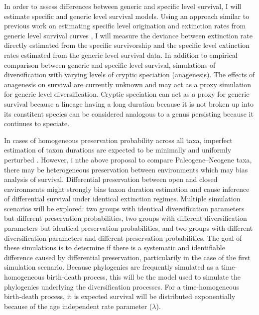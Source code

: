 \documentclass[12pt,letterpaper]{article}
\begin{document}
In order to assess differences between generic and specific level survival, I will estimate specific and generic level survival models. Using an approach similar to previous work on estimating specific level origination and extinction rates from generic level survival curves \citep{Foote1988}, I will measure the deviance between extinction rate directly estimated from the specific survivorship and the specific level extinction rates estimated from the generic level survival data. In addition to empirical comparison between generic and specific level survival, simulations of diversification with varying levels of cryptic speciation (anagenesis). The effects of anagenesis on survival are currently unknown and may act as a proxy simulation for generic level diversification. Cryptic speciation can act as a proxy for generic survival because a lineage having a long duration because it is not broken up into its constitent species can be considered analogous to a genus persisting because it continues to speciate. %

In cases of homogeneous preservation probability across all taxa, imperfect estimation of taxon durations are expected to be minimally and uniformly perturbed \citep{Sepkoski1975}. However, i nthe above proposal to compare Paleogene--Neogene taxa, there may be heterogeneous preservation between environments which may bias analysis of survival. Differential preservation between open and closed environments might strongly bias taxon duration estimation and cause inference of differential survival under identical extinction regimes. Multiple simulation scenarios will be explored: two groups with identical diversification parameters but different preservation probabilities, two groups with different diversification parameters but identical preservation probabilities, and two groups with different diversification parameters and different preservation probabilities. The goal of these simulations is to determine if there is a systematic and identifiable difference caused by differential preservation, particularily in the case of the first simulation scenario. Because phylogenies are frequently simulated as a time-homogeneous birth-death process, this will be the model used to simulate the phylogenies underlying the diversification processes. For a time-homogeneous birth-death process, it is expected survival will be distributed exponentially because of the age independent rate parameter (\(\lambda\)). 
\end{document}
